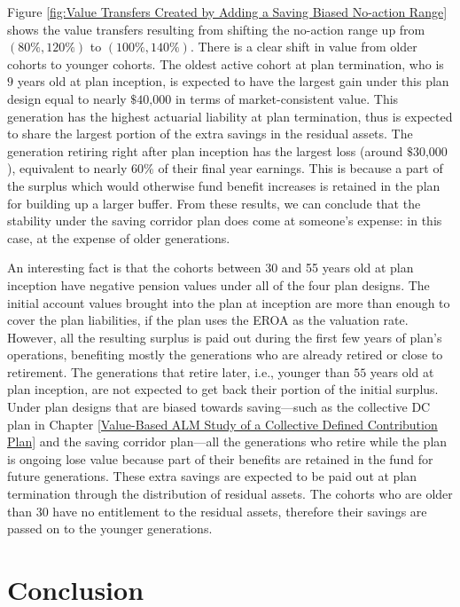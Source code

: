 \documentclass{sfuthesis}
\numberwithin{equation}{chapter}
\begin{document}
	
		\justify
		Figure \ref{fig:Value Transfers Created by Adding a Saving Biased No-action Range} shows the value transfers resulting from shifting the no-action range up from $(80\%, 120\%)$ to $(100\%, 140\%)$. There is a clear shift in value from older cohorts to younger cohorts. The oldest active cohort at plan termination, who is $9$ years old at plan inception, is expected to have the largest gain under this plan design equal to nearly $\$40\text{,}000$ in terms of market-consistent value. This generation has the highest actuarial liability at plan termination, thus is expected to share the largest portion of the extra savings in the residual assets. The generation retiring right after plan inception has the largest loss (around $\$30\text{,}000$), equivalent to nearly $60\%$ of their final year earnings. This is because a part of the surplus which would otherwise fund benefit increases is retained in the plan for building up a larger buffer. From these results, we can conclude that the stability under the saving corridor plan does come at someone's expense: in this case, at the expense of older generations. 
	
		\justify
		An interesting fact is that the cohorts between 30 and 55 years old at plan inception have negative pension values under all of the four plan designs. The initial account values brought into the plan at inception are more than enough to cover the plan liabilities, if the plan uses the EROA as the valuation rate. However, all the resulting surplus is paid out during the first few years of plan's operations, benefiting mostly the generations who are already retired or close to retirement. The generations that retire later, i.e., younger than $55$ years old at plan inception, are not expected to get back their portion of the initial surplus. Under plan designs that are biased towards saving---such as the collective DC plan in Chapter \ref{Value-Based ALM Study of a Collective Defined Contribution Plan} and the saving corridor plan---all the generations who retire while the plan is ongoing lose value because part of their benefits are retained in the fund for future generations. These extra savings are expected to be paid out at plan termination through the distribution of residual assets. The cohorts who are older than $30$ have no entitlement to the residual assets, therefore their savings are passed on to the younger generations. 
	
	
	\chapter{Conclusion}
	\label{Conclusion}
\end{document}

